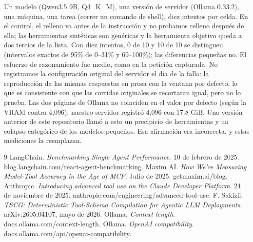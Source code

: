 \documentclass[10pt]{article}
\begin{document}
Un modelo (Qwen3.5 9B, Q4\_K\_M), una versión de servidor (Ollama 0.33.2), una máquina, una tarea (correr un comando de shell), diez intentos por celda. En el control, el relleno va antes de la instrucción y no probamos relleno después de ella; las herramientas sintéticas son genéricas y la herramienta objetivo queda a dos tercios de la lista. Con diez intentos, 0 de 10 y 10 de 10 se distinguen (intervalos exactos de 95\% de 0--31\% y 69--100\%); las diferencias pequeñas no. El esfuerzo de razonamiento fue medio, como en la petición capturada. No registramos la configuración original del servidor el día de la falla: la reproducción da las mismas respuestas en prosa con la ventana por defecto, lo que es consistente con que las corridas originales se recortaran igual, pero no lo prueba. Las dos páginas de Ollama no coinciden en el valor por defecto (según la VRAM contra 4,096); nuestro servidor registró 4,096 con 17.8 GiB. Una versión anterior de este repositorio llamó a esto un precipicio de herramientas y un colapso categórico de los modelos pequeños. Esa afirmación era incorrecta, y estas mediciones la reemplazan.

{\small\setlength{\itemsep}{0pt}\begin{thebibliography}{9}
 LangChain. \textit{Benchmarking Single Agent Performance}. 10 de febrero de 2025. blog.langchain.com/react-agent-benchmarking.
 Maxim AI. \textit{How We're Measuring Model-Tool Accuracy in the Age of MCP}. Julio de 2025. getmaxim.ai/blog.
 Anthropic. \textit{Introducing advanced tool use on the Claude Developer Platform}. 24 de noviembre de 2025. anthropic.com/engineering/advanced-tool-use.
 F. Sakizli. \textit{TSCG: Deterministic Tool-Schema Compilation for Agentic LLM Deployments}. arXiv:2605.04107, mayo de 2026.
 Ollama. \textit{Context length}. docs.ollama.com/context-length.
 Ollama. \textit{OpenAI compatibility}. docs.ollama.com/api/openai-compatibility.
\end{thebibliography}}
\end{document}
